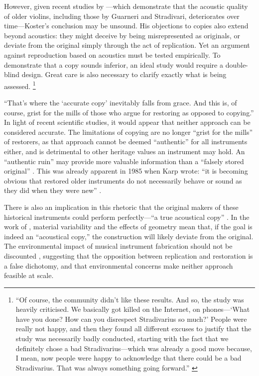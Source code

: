 However, given recent studies by \textcite{fritz_player_2012,
fritz_soloist_2014, fritz_listener_2017}---which demonstrate that the acoustic
quality of older violins, including those by Guarneri and Stradivari,
deteriorates over time---Koster’s conclusion may be unsound. His objections to
copies also extend beyond acoustics: they might deceive by being misrepresented
as originals, or deviate from the original simply through the act of
replication. Yet an argument against reproduction based on acoustics must be
tested empirically. To demonstrate that a copy sounds inferior, an ideal study
would require a double-blind design. Great care is also necessary to clarify
exactly what is being assessed.
\footnote{``Of course, the community didn't like
these results. And so, the study was heavily criticised. We basically got killed
on the Internet, on phones---`What have you done? How can you disrespect
Stradivarius so much?' People were really not happy, and then they found all
different excuses to justify that the study was necessarily badly conducted,
starting with the fact that we definitely chose a bad Stradivarius---which was
already a good move because, I mean, now people were happy to acknowledge that
there could be a bad Stradivarius. That was always something going forward.''
\cite{fritz_musica_2017}}

``That's where the `accurate copy' inevitably falls from grace. And this is, of
course, grist for the mills of those who argue for restoring as opposed to
copying.'' In light of recent scientific studies, it would appear that neither
approach can be considered accurate. The limitations of copying are no longer
``grist for the mills'' \cite[p.\ 81]{barclay_preservation_2005} of restorers, as
that approach cannot be deemed ``authentic'' for all instruments either, and is
detrimental to other heritage values an instrument may hold. An ``authentic
ruin'' may provide more valuable information than a ``falsely stored original''
\cite[Citing Martin Skowroneck][p.\ 78]{barclay_preservation_2005}. This was
already apparent in 1985 when Karp wrote: ``it is becoming obvious that restored
older instruments do not necessarily behave or sound as they did when they were
new'' \cite{karp_musical_1985}.

There is also an implication in this rhetoric that the original makers of these
historical instruments could perform perfectly---``a true acoustical copy''
\cite{koster_exact_1994}. In the work of \textcite{viala_simultaneous_2020},
material variability and the effects of geometry mean that, if the goal is
indeed an ``acoustical copy,'' the construction will likely deviate from the
original. The environmental impact of musical instrument fabrication should not
be discounted \cite{allen_fatto_2012}, suggesting that the opposition between
replication and restoration is a false dichotomy, and that environmental
concerns make neither approach feasible at scale.


